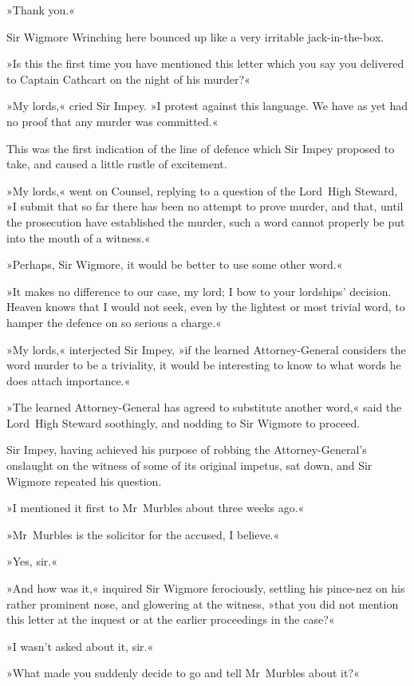»Thank you.«

Sir Wigmore Wrinching here bounced up like a very irritable jack-in-the-box.

»Is this the first time you have mentioned this letter which you say you delivered to Captain Cathcart on the night of his murder?«

»My lords,« cried Sir Impey. »I protest against this language. We have as yet had no proof that any murder was committed.«

This was the first indication of the line of defence which Sir Impey proposed to take, and caused a little rustle of excitement.

»My lords,« went on Counsel, replying to a question of the Lord~High Steward, »I submit that so far there has been no attempt to prove murder, and that, until the prosecution have established the murder, such a word cannot properly be put into the mouth of a witness.«

»Perhaps, Sir Wigmore, it would be better to use some other word.«

»It makes no difference to our case, my lord; I bow to your lordships' decision. Heaven knows that I would not seek, even by the lightest or most trivial word, to hamper the defence on so serious a charge.«

»My lords,« interjected Sir Impey, »if the learned Attorney-General considers the word murder to be a triviality, it would be interesting to know to what words he does attach importance.«

»The learned Attorney-General has agreed to substitute another word,« said the Lord~High Steward soothingly, and nodding to Sir Wigmore to proceed.

Sir Impey, having achieved his purpose of robbing the Attorney-General's onslaught on the witness of some of its original impetus, sat down, and Sir Wigmore repeated his question.

»I mentioned it first to Mr~Murbles about three weeks ago.«

»Mr~Murbles is the solicitor for the accused, I believe.«

»Yes, sir.«

»And how was it,« inquired Sir Wigmore ferociously, settling his pince-nez on his rather prominent nose, and glowering at the witness, »that you did not mention this letter at the inquest or at the earlier proceedings in the case?«

»I wasn't asked about it, sir.«

»What made you suddenly decide to go and tell Mr~Murbles about it?«

